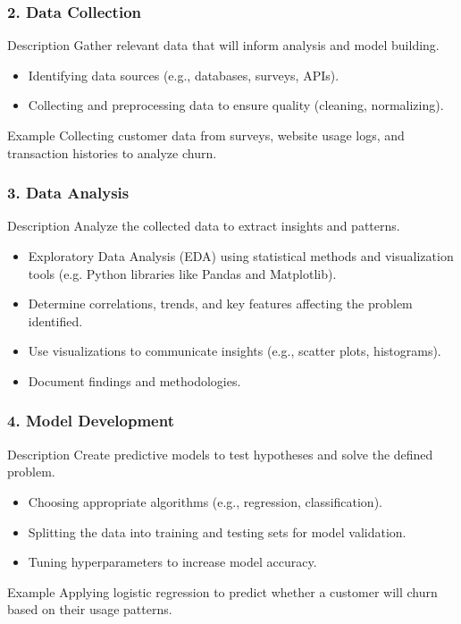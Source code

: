 \documentclass[aspectratio=169]{beamer}
\begin{document}
\begin{frame}[fragile]
    \frametitle{2. Data Collection}
    \begin{block}{Description}
        Gather relevant data that will inform analysis and model building.
    \end{block}
    \begin{itemize}
        \item Identifying data sources (e.g., databases, surveys, APIs).
        \item Collecting and preprocessing data to ensure quality (cleaning, normalizing).
    \end{itemize}
    \begin{block}{Example}
        Collecting customer data from surveys, website usage logs, and transaction histories to analyze churn.
    \end{block}
\end{frame}

\begin{frame}[fragile]
    \frametitle{3. Data Analysis}
    \begin{block}{Description}
        Analyze the collected data to extract insights and patterns.
    \end{block}
    \begin{itemize}
        \item Exploratory Data Analysis (EDA) using statistical methods and visualization tools (e.g. Python libraries like Pandas and Matplotlib).
        \item Determine correlations, trends, and key features affecting the problem identified.
    \end{itemize}
    \begin{itemize}
        \item Use visualizations to communicate insights (e.g., scatter plots, histograms).
        \item Document findings and methodologies.
    \end{itemize}
\end{frame}

\begin{frame}[fragile]
    \frametitle{4. Model Development}
    \begin{block}{Description}
        Create predictive models to test hypotheses and solve the defined problem.
    \end{block}
    \begin{itemize}
        \item Choosing appropriate algorithms (e.g., regression, classification).
        \item Splitting the data into training and testing sets for model validation.
        \item Tuning hyperparameters to increase model accuracy.
    \end{itemize}
    \begin{block}{Example}
        Applying logistic regression to predict whether a customer will churn based on their usage patterns.
    \end{block}
\end{frame}
\end{document}

